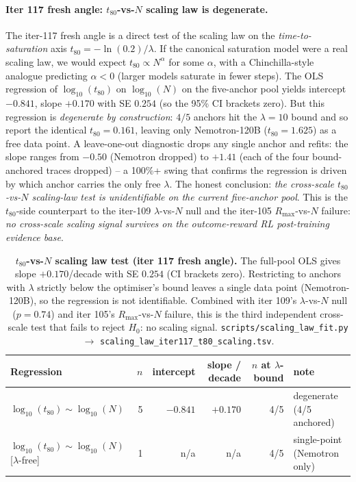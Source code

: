 \paragraph{Iter 117 fresh angle: $t_{80}$-vs-$N$ scaling law is degenerate.}
\label{par:scaling-iter117-t80}
The iter-117 fresh angle is a direct test of the scaling law on the
\emph{time-to-saturation} axis $t_{80}=-\ln(0.2)/\lambda$.  If the
canonical saturation model were a real scaling law, we would expect
$t_{80} \propto N^{\alpha}$ for some $\alpha$, with a Chinchilla-style
analogue predicting $\alpha < 0$ (larger models saturate in fewer
steps).  The OLS regression of $\log_{10}(t_{80})$ on $\log_{10}(N)$
on the five-anchor pool yields intercept $-0.841$, slope $+0.170$
with SE $0.254$ (so the 95\% CI brackets zero).  But this regression
is \emph{degenerate by construction}: $4/5$ anchors hit the
$\lambda = 10$ bound and so report the identical $t_{80} = 0.161$,
leaving only Nemotron-120B ($t_{80} = 1.625$) as a free data point.
A leave-one-out diagnostic drops any single anchor and refits: the
slope ranges from $-0.50$ (Nemotron dropped) to $+1.41$ (each of
the four bound-anchored traces dropped) -- a 100\%+ swing that
confirms the regression is driven by which anchor carries the only
free $\lambda$.  The honest conclusion: \emph{the cross-scale
$t_{80}$-vs-$N$ scaling-law test is unidentifiable on the current
five-anchor pool}.  This is the $t_{80}$-side counterpart to the
iter-109 $\lambda$-vs-$N$ null and the iter-105 $R_{\max}$-vs-$N$
failure: \emph{no cross-scale scaling signal survives on the
outcome-reward RL post-training evidence base}.

\begin{table}[t]
  \centering
  \small
  \begin{tabular}{lrrrrl}
    \toprule
    Regression & $n$ & intercept & slope / decade &
                $n$ at $\lambda$-bound & note \\
    \midrule
    $\log_{10}(t_{80}) \sim \log_{10}(N)$              & 5 & $-0.841$ & $+0.170$ & 4/5 & degenerate (4/5 anchored) \\
    $\log_{10}(t_{80}) \sim \log_{10}(N)$ [$\lambda$-free] & 1 & n/a     & n/a       & 4/5 & single-point (Nemotron only) \\
    \bottomrule
  \end{tabular}
  \caption{\textbf{$t_{80}$-vs-$N$ scaling law test (iter 117 fresh
    angle).}  The full-pool OLS gives slope $+0.170$/decade with
    SE $0.254$ (CI brackets zero).  Restricting to anchors with
    $\lambda$ strictly below the optimiser's bound leaves a single
    data point (Nemotron-120B), so the regression is not
    identifiable.  Combined with iter 109's $\lambda$-vs-$N$ null
    ($p = 0.74$) and iter 105's $R_{\max}$-vs-$N$ failure, this is
    the third independent cross-scale test that fails to reject
    $H_0$: no scaling signal.  \texttt{scripts/scaling\_law\_fit.py}
    $\to$ \texttt{scaling\_law\_iter117\_t80\_scaling.tsv}.}
  \label{tab:scaling-iter117-t80}
\end{table}

